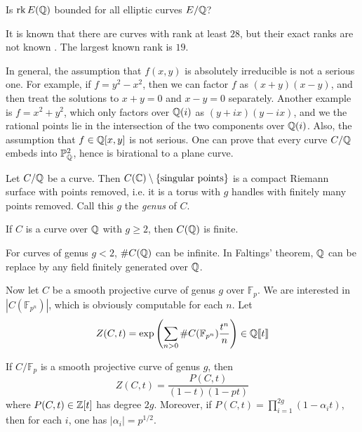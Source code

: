 \documentclass{article}
\begin{document}
\begin{question}
Is $\operatorname{rk} E(\mathbb{Q})$ bounded for all elliptic curves 
$E/\mathbb{Q}$?
\end{question}

It is known that there are curves with rank at least $28$, but their exact 
ranks are not known \cite{du}. The largest known rank is $19$. 

In general, the assumption that $f(x,y)$ is absolutely irreducible is not a 
serious one. For example, if $f=y^2-x^2$, then we can factor $f$ as 
$(x+y)(x-y)$, and then treat the solutions to $x+y=0$ and $x-y=0$ separately. 
Another example is $f=x^2+y^2$, which only factors over $\mathbb{Q}(i)$ as 
$(y+i x)(y-i x)$, and we the rational points lie in the intersection of the 
two components over $\mathbb{Q}(i)$. Also, the assumption that 
$f\in \mathbb{Q}[x,y]$ is not serious. One can prove that every curve 
$C/\mathbb{Q}$ embeds into $\mathbb{P}^2_{\mathbb{Q}}$, hence is birational to 
a plane curve. 

Let $C/\mathbb{Q}$ be a curve. Then 
$C(\mathbb{C})\setminus \{\text{singular points}\}$ is a compact Riemann 
surface with points removed, i.e. it is a torus with $g$ handles with finitely 
many points removed. Call this $g$ the \emph{genus} of $C$. 

\begin{theorem}
If $C$ is a curve over $\mathbb{Q}$ with $g\geqslant 2$, then $C(\mathbb{Q})$ 
is finite. 
\end{theorem}

For curves of genus $g<2$, $\# C(\mathbb{Q})$ can be infinite. In Faltings' 
theorem, $\mathbb{Q}$ can be replace by any field finitely generated over 
$\mathbb{Q}$. 

Now let $C$ be a smooth projective curve of genus $g$ over $\mathbb{F}_p$. 
We are interested in $|C(\mathbb{F}_{p^n})|$, which is obviously computable 
for each $n$. Let 
\[
  Z(C,t) = \exp\left( \sum_{n>0} \# C(\mathbb{F}_{p^n}) \frac{t^n}{n} \right) \in \mathbb{Q}\llbracket t\rrbracket 
\]

\begin{theorem}[Weil]
If $C/\mathbb{F}_p$ is a smooth projective curve of genus $g$, then 
\[
  Z(C,t) = \frac{P(C,t)}{(1-t)(1-p t)}
\]
where $P(C,t)\in \mathbb{Z}[t]$ has degree $2 g$. Moreover, if 
$P(C,t) = \prod_{i=1}^{2 g} (1-\alpha_i t)$, then for each $i$, one has 
$|\alpha_i|=p^{1/2}$. 
\end{theorem}
\end{document}
